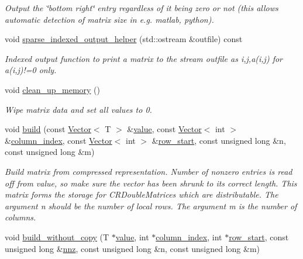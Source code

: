 \begin{DoxyCompactItemize}
\begin{DoxyCompactList}\small\item\em Output the \char`\"{}bottom right\char`\"{} entry regardless of it being zero or not (this allows automatic detection of matrix size in e.\+g. matlab, python). \end{DoxyCompactList}\item 
void \hyperlink{classoomph_1_1CRMatrix_af34167172020d60e5fa382e4bd5d6466}{sparse\+\_\+indexed\+\_\+output\+\_\+helper} (std\+::ostream \&outfile) const
\begin{DoxyCompactList}\small\item\em Indexed output function to print a matrix to the stream outfile as i,j,a(i,j) for a(i,j)!=0 only. \end{DoxyCompactList}\item 
void \hyperlink{classoomph_1_1CRMatrix_a14f6cf02e78e14afc9a50eb73c6d517a}{clean\+\_\+up\+\_\+memory} ()
\begin{DoxyCompactList}\small\item\em Wipe matrix data and set all values to 0. \end{DoxyCompactList}\item 
void \hyperlink{classoomph_1_1CRMatrix_a73e05d0fc4fe5fb402416b18f17316b8}{build} (const \hyperlink{classoomph_1_1Vector}{Vector}$<$ T $>$ \&\hyperlink{classoomph_1_1SparseMatrix_a3e382ff145082821a6b0b3e63b6aed5d}{value}, const \hyperlink{classoomph_1_1Vector}{Vector}$<$ int $>$ \&\hyperlink{classoomph_1_1CRMatrix_aa6057d1c2a9a491f643e0633c778f8fb}{column\+\_\+index}, const \hyperlink{classoomph_1_1Vector}{Vector}$<$ int $>$ \&\hyperlink{classoomph_1_1CRMatrix_a6210ebb3d384de9c3a289f5d841a0d7a}{row\+\_\+start}, const unsigned long \&n, const unsigned long \&m)
\begin{DoxyCompactList}\small\item\em Build matrix from compressed representation. Number of nonzero entries is read off from value, so make sure the vector has been shrunk to its correct length. This matrix forms the storage for C\+R\+Double\+Matrices which are distributable. The argument n should be the number of local rows. The argument m is the number of columns. \end{DoxyCompactList}\item 
void \hyperlink{classoomph_1_1CRMatrix_aee41b01876f3b8ce9011e6fe7a332da6}{build\+\_\+without\+\_\+copy} (T $\ast$\hyperlink{classoomph_1_1SparseMatrix_a3e382ff145082821a6b0b3e63b6aed5d}{value}, int $\ast$\hyperlink{classoomph_1_1CRMatrix_aa6057d1c2a9a491f643e0633c778f8fb}{column\+\_\+index}, int $\ast$\hyperlink{classoomph_1_1CRMatrix_a6210ebb3d384de9c3a289f5d841a0d7a}{row\+\_\+start}, const unsigned long \&\hyperlink{classoomph_1_1SparseMatrix_a8b8010edcc0869283621e72a9bbc51e3}{nnz}, const unsigned long \&n, const unsigned long \&m)

\end{DoxyCompactItemize}
